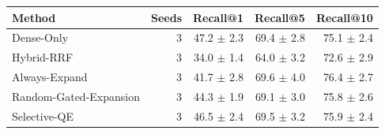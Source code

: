 \begin{tabular}{lrrrr}
\toprule
Method & Seeds & Recall@1 & Recall@5 & Recall@10 \\
\midrule
Dense-Only & 3 & 47.2 $\pm$ 2.3 & 69.4 $\pm$ 2.8 & 75.1 $\pm$ 2.4 \\
Hybrid-RRF & 3 & 34.0 $\pm$ 1.4 & 64.0 $\pm$ 3.2 & 72.6 $\pm$ 2.9 \\
Always-Expand & 3 & 41.7 $\pm$ 2.8 & 69.6 $\pm$ 4.0 & 76.4 $\pm$ 2.7 \\
Random-Gated-Expansion & 3 & 44.3 $\pm$ 1.9 & 69.1 $\pm$ 3.0 & 75.8 $\pm$ 2.6 \\
Selective-QE & 3 & 46.5 $\pm$ 2.4 & 69.5 $\pm$ 3.2 & 75.9 $\pm$ 2.4 \\
\bottomrule
\end{tabular}
